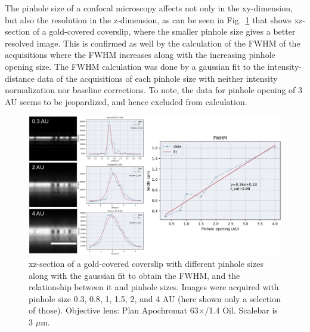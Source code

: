 The pinhole size of a confocal microscopy affects not only in the xy-dimension, but also the resolution in the z-dimension, as can be seen in Fig.~\ref{fig:goldpin} that shows xz-section of a gold-covered coverslip, where the smaller pinhole size gives a better resolved image. 
This is confirmed as well by the calculation of the FWHM of the acquisitions where the FWHM increases along with the increasing pinhole opening size. 
The FWHM calculation was done by a gaussian fit to the intensity-distance data of the acquisitions of each pinhole size with neither intensity normalization nor baseline corrections. 
To note, the data for pinhole opening of 3 AU seems to be jeopardized, and hence excluded from calculation. 

\begin{figure}[h!]
\centering
\includegraphics[width=.9\columnwidth]{Exp_3_LSM/Figures/MS3/F7a}	
\caption{xz-section of a gold-covered coverslip with different pinhole sizes along with the gaussian fit to obtain the FWHM, and the relationship between it and pinhole sizes. 
Images were acquired with pinhole size 0.3, 0.8, 1, 1.5, 2, and 4 AU (here shown only a selection of those). 
Objective lens: Plan Apochromat 63$\times$/1.4 Oil. 
Scalebar is 3 $\mu$m.}
\label{fig:goldpin}
\end{figure}



\renewcommand{\refname}{\spacedlowsmallcaps{References}} %

%



